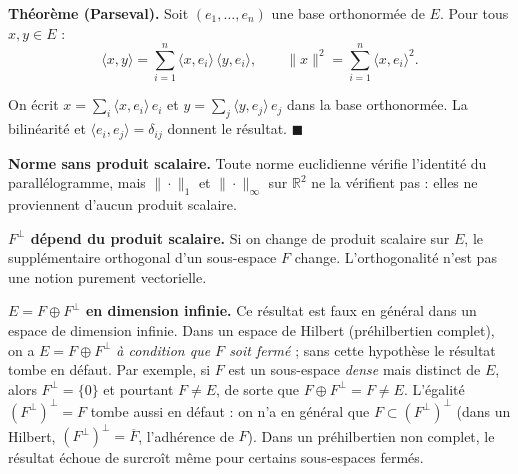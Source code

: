 
\begin{tcolorbox}[thmbox]
  \textbf{Théorème (Parseval).}\enspace%
  Soit $(e_1,\ldots,e_n)$ une base orthonormée de $E$. Pour tous $x, y \in E$ :
  \[
    \langle x,y\rangle = \sum_{i=1}^n \langle x,e_i\rangle\,\langle y,e_i\rangle,
    \qquad
    \|x\|^2 = \sum_{i=1}^n \langle x, e_i\rangle^2.
  \]
\end{tcolorbox}

\begin{mdframed}[style=proofbar]
  On écrit $x = \sum_i \langle x,e_i\rangle\,e_i$ et
  $y = \sum_j \langle y,e_j\rangle\,e_j$ dans la base orthonormée.
  La bilinéarité et $\langle e_i,e_j\rangle = \delta_{ij}$ donnent le résultat.
  $\blacksquare$
\end{mdframed}

\decsep{}



\begin{mdframed}[style=cexbar]
  \textbf{Norme sans produit scalaire.}\enspace%
  Toute norme euclidienne vérifie l'identité du parallélogramme, mais
  $\|\cdot\|_1$ et $\|\cdot\|_\infty$ sur $\mathbb{R}^2$ ne la vérifient pas :
  elles ne proviennent d'aucun produit scalaire.

  \smallskip\noindent
  \textbf{$F^\perp$ dépend du produit scalaire.}\enspace%
  Si on change de produit scalaire sur $E$, le supplémentaire orthogonal d'un
  sous-espace $F$ change. L'orthogonalité n'est pas une notion purement vectorielle.

  \smallskip\noindent
  \textbf{$E = F \oplus F^\perp$ en dimension infinie.}\enspace%
  Ce résultat est faux en général dans un espace de dimension infinie.
  Dans un espace de Hilbert (préhilbertien complet), on a $E = F \oplus F^\perp$
  \emph{à condition que $F$ soit fermé} ; sans cette hypothèse le résultat tombe en
  défaut. Par exemple, si $F$ est un sous-espace \emph{dense} mais distinct de $E$,
  alors $F^\perp = \{0\}$ et pourtant $F \neq E$, de sorte que $F \oplus F^\perp = F
  \neq E$. L'égalité $(F^\perp)^\perp = F$ tombe aussi en défaut : on n'a en
  général que $F \subset (F^\perp)^\perp$ (dans un Hilbert,
  $(F^\perp)^\perp = \overline{F}$, l'adhérence de $F$). Dans un préhilbertien
  non complet, le résultat échoue de surcroît même pour certains sous-espaces
  fermés.
\end{mdframed}

